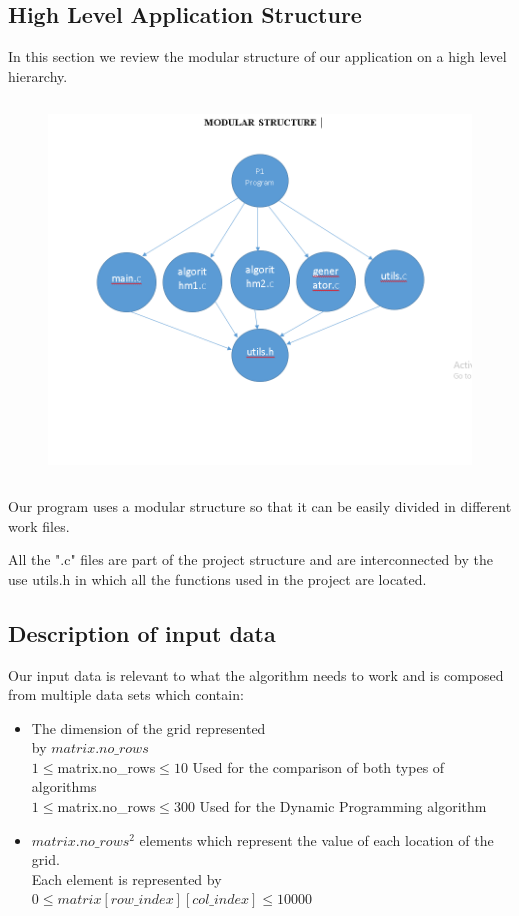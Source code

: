 \documentclass{article}
\begin{document}
\subsection{High Level Application Structure}
\par In this section we review the modular structure of our application on a high level hierarchy. 
\begin{figure}[h]
\includegraphics[width=12 cm, height=10cm]{structure}
\end{figure}
\par Our program uses a modular structure so that it can be easily divided 
in different work files.
\par All the ".c" files are part of the project structure and are interconnected by the use utils.h in which all the functions used in the project are located. 
\newpage
\subsection{Description of input data}
\par Our input data is relevant to what the algorithm needs to work and is composed
from multiple data sets which contain:
 \begin{itemize}
     \item The dimension of the grid represented 
    \\ by $matrix.no\_rows$ 
    \\$1 \le $matrix.no\_rows$ \le 10 $ Used for the comparison of both types of algorithms
    \\$1 \le $matrix.no\_rows$ \le 300 $ Used for the Dynamic Programming algorithm
     \item $matrix.no\_rows^2$ elements which represent the value of each location 
     of the grid.
     \\Each element is represented by \\$0 \le matrix[row\_index][col\_index] \le 10000$
   \end{itemize}
\end{document}
